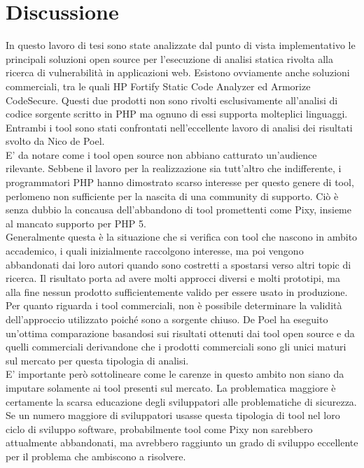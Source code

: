 \chapter{Discussione}
In questo lavoro di tesi sono state analizzate dal punto di vista implementativo le principali soluzioni open source per l'esecuzione di analisi statica rivolta alla ricerca di vulnerabilità in applicazioni web. Esistono ovviamente anche soluzioni commerciali, tra le quali HP Fortify Static Code Analyzer\cite{fortify} ed Armorize CodeSecure\cite{codesecure}. Questi due prodotti non sono rivolti esclusivamente all'analisi di codice sorgente scritto in PHP ma ognuno di essi supporta molteplici linguaggi. Entrambi i tool sono stati confrontati nell'eccellente lavoro di analisi dei risultati svolto da Nico de Poel\cite{depoel}.\\
E' da notare come i tool open source non abbiano catturato un'audience rilevante. Sebbene il lavoro per la realizzazione sia tutt'altro che indifferente, i programmatori PHP hanno dimostrato scarso interesse per questo genere di tool, perlomeno non sufficiente per la nascita di una community di supporto. Ciò è senza dubbio la concausa dell'abbandono di tool promettenti come Pixy, insieme al mancato supporto per PHP 5.\\
Generalmente questa è la situazione che si verifica con tool che nascono in ambito accademico, i quali inizialmente raccolgono interesse, ma poi vengono abbandonati dai loro autori quando sono costretti a spostarsi verso altri topic di ricerca. Il risultato porta ad avere molti approcci diversi e molti prototipi, ma alla fine nessun prodotto sufficientemente valido per essere usato in produzione.\\
Per quanto riguarda i tool commerciali, non è possibile determinare la validità dell'approccio utilizzato poiché sono a sorgente chiuso. De Poel ha eseguito un'ottima comparazione basandosi sui risultati ottenuti dai tool open source e da quelli commerciali derivandone che i prodotti commerciali sono gli unici maturi sul mercato per questa tipologia di analisi.\\
E' importante però sottolineare come le carenze in questo ambito non siano da imputare solamente ai tool presenti sul mercato. La problematica maggiore è certamente la scarsa educazione degli sviluppatori alle problematiche di sicurezza. Se un numero maggiore di sviluppatori usasse questa tipologia di tool nel loro ciclo di sviluppo software, probabilmente tool come Pixy non sarebbero attualmente abbandonati, ma avrebbero raggiunto un grado di sviluppo eccellente per il problema che ambiscono a risolvere.\\
